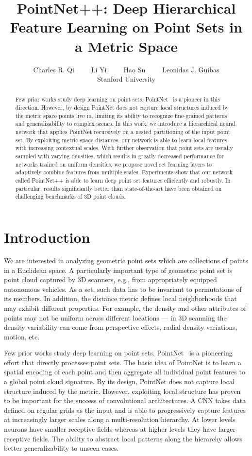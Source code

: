 \documentclass{article}
\title{PointNet++: Deep Hierarchical Feature Learning on Point Sets in a Metric Space}
\author{
  Charles R. Qi~~~~~Li Yi~~~~~Hao Su~~~~~Leonidas J. Guibas \\
  Stanford University
}
\begin{document}
\maketitle

\begin{abstract}
  

Few prior works study deep learning on point sets.
PointNet~\cite{qi2016pointnet} is a pioneer in this direction. However, by design PointNet does not capture local structures induced by the metric space points live in, limiting its ability to recognize fine-grained patterns and generalizability to complex scenes.
In this work, we introduce a hierarchical neural network that applies PointNet recursively on a nested partitioning of the input point set. By exploiting metric space distances, our network is able to learn local features with increasing contextual scales.
With further observation that point sets are usually sampled with varying densities, which results in greatly decreased performance for networks trained on uniform densities, we propose novel set learning layers to adaptively combine features from multiple scales.
Experiments show that our network called PointNet++ is able to learn deep point set features efficiently and robustly. In particular, results significantly better than state-of-the-art have been obtained on challenging benchmarks of 3D point clouds. \end{abstract}

\section{Introduction}


We are interested in analyzing geometric point sets which are collections of points in a Euclidean space. A particularly important type of geometric point set is point cloud captured by 3D scanners, e.g., from appropriately equipped autonomous vehicles. As a set, such data has to be invariant to permutations of its members. In addition, the distance metric defines local neighborhoods that may exhibit different properties. For example, the density and other attributes of points may not be uniform across different locations --- in 3D scanning the density variability can come from perspective effects, radial density variations, motion, etc.

Few prior works study deep learning on point sets. PointNet~\cite{qi2016pointnet} is a pioneering effort that directly processes point sets. The basic idea of PointNet is to learn a spatial encoding of each point and then aggregate all individual point features to a global point cloud signature.
By its design, PointNet does not capture local structure induced by the metric. However, exploiting local structure has proven to be important for the success of convolutional architectures. A CNN takes data defined on regular grids as the input and is able to progressively capture features at increasingly larger scales along a multi-resolution hierarchy. At lower levels neurons have smaller receptive fields whereas at higher levels they have larger receptive fields. The ability to abstract local patterns along the hierarchy allows better generalizability to unseen cases.
\end{document}
